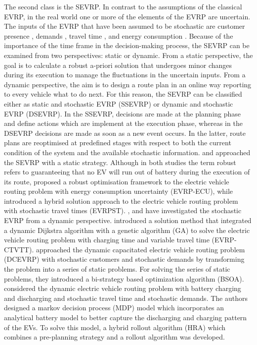 \documentclass[11pt]{article}
\begin{document}
The second class is the SEVRP. In contrast to the assumptions of the classical EVRP, in the real world one or more of the elements of the EVRP are uncertain. The inputs of the EVRP that have been assumed to be stochastic are customer presence \citep{Shi2019}, demands \citep{Lu2019}, travel time \citep{Shao2017, Bi2019, Reyes2019}, and energy consumption \citep{Pelletier2019}. Because of the importance of the time frame in the decision-making process, the SEVRP can be examined from two perspectives: static or dynamic. From a static perspective, the goal is to calculate a robust a-priori solution that undergoes minor changes during its execution to manage the fluctuations in the uncertain inputs. From a dynamic perspective, the aim is to design a route plan in an online way reporting to every vehicle what to do next. For this reason, the SEVRP can be classified either as static and stochastic EVRP (SSEVRP) or dynamic and stochastic EVRP (DSEVRP). In the SSEVRP, decisions are made at the planning phase and define actions which are implement at the execution phase, whereas in the DSEVRP decisions are made as soon as a new event occurs. In the latter, route plans are reoptimised at predefined stages with respect to both the current condition of the system and the available stochastic information. \cite{Pelletier2019} and \cite{Reyes2019} approached the SEVRP with a static strategy. Although in both studies the term robust refers to guaranteeing that no EV will run out of battery during the execution of its route, \cite{Pelletier2019} proposed a robust optimisation framework to the electric vehicle routing problem with energy consumption uncertainty (EVRP-ECU), while \cite{Reyes2019} introduced a hybrid solution approach to the electric vehicle routing problem with stochastic travel times (EVRPST). \cite{Shao2017}, \cite{Lu2019} and \cite{Bi2019} have investigated the stochastic EVRP from a dynamic perspective. \cite{Shao2017} introduced a solution method that integrated a dynamic Dijkstra algorithm with a genetic algorithm (GA) to solve the electric vehicle routing problem with charging time and variable travel time (EVRP-CTVTT). \cite{Lu2019} approached the dynamic capacitated electric vehicle routing problem (DCEVRP) with stochastic customers and stochastic demands by transforming the problem into a series of static problems. For solving the series of static problems, they introduced a bi-strategy based optimization algorithm (BSOA). \cite{Bi2019} considered the dynamic electric vehicle routing problem with battery charging and discharging and stochastic travel time and stochastic demands. The authors designed a markov decision process (MDP) model which incorporates an analytical battery model to better capture the discharging and charging pattern of the EVs. To solve this model, a hybrid rollout algorithm (HRA) which combines a pre-planning strategy and a rollout algorithm was developed.
\end{document}
